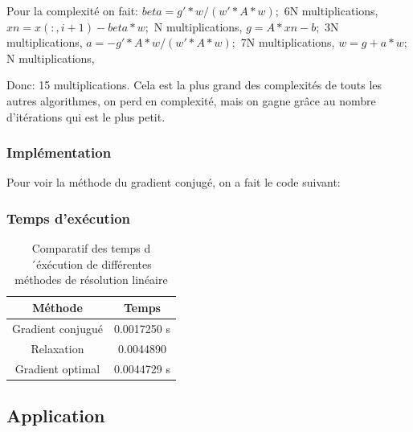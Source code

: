 \documentclass[a4paper,11pt]{article}
\begin{document}
Pour la complexité on fait:
$ beta = g'*w/(w'*A*w);$ 6N multiplications,
$ xn = x(:,i+1)-beta*w;$ N multiplications,
$ g = A*xn-b;$ 3N multiplications,
$ a = -g'*A*w/(w'*A*w);$ 7N multiplications,
$ w=g+a*w;$ N multiplications,

Donc: 15  multiplications. Cela est la  plus grand des complexités  de touts les
autres algorithmes, on perd en
complexité, mais on gagne grâce au nombre d'itérations qui est le plus petit.

\subsubsection{Implémentation}

Pour voir la méthode du gradient conjugé, on a fait le code suivant:

\begin{multicols}{2}
  
\end{multicols}


\subsubsection{Temps d'exécution}

\begin{table}[h!]
  \begin{center}
    \begin{tabular}{|c|c|}
      \hline 
      Méthode & Temps \\
      \hline 
      \hline 
      Gradient conjugué & 0.0017250 s\\
      Relaxation & 0.0044890\\
      Gradient optimal & 0.0044729 s\\
      \hline 
    \end{tabular}
  \end{center}
  \caption{Comparatif des temps d´éxécution de différentes méthodes de
    résolution linéaire}
\end{table}


\subsection{Application }

\begin{multicols}{2}
  
\end{multicols}
\end{document}

